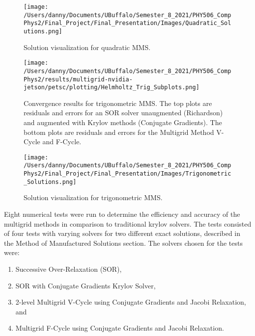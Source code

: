\documentclass[]{article}
\theoremstyle{definition}
\begin{document}
\begin{figure}[H]
\begin{center}
\texttt{[image: /Users/danny/Documents/UBuffalo/Semester\_8\_2021/PHY506\_CompPhys2/Final\_Project/Final\_Presentation/Images/Quadratic\_Solutions.png]}
\end{center}
\caption{Solution visualization for quadratic MMS.}
\label{VisQuad}
\end{figure}

\begin{figure}[H]
\begin{center}
\texttt{[image: /Users/danny/Documents/UBuffalo/Semester\_8\_2021/PHY506\_CompPhys2/results/multigrid-nvidia-jetson/petsc/plotting/Helmholtz\_Trig\_Subplots.png]}
\end{center}
\caption{Convergence results for trigonometric MMS.  The top plots are residuals and errors for an SOR solver unaugmented (Richardson) and augmented with Krylov methods (Conjugate Gradients).  The bottom plots are residuals and errors for the Multigrid Method V-Cycle and F-Cycle.}
\label{ConvTrig}
\end{figure}

\begin{figure}[H]
\begin{center}
\texttt{[image: /Users/danny/Documents/UBuffalo/Semester\_8\_2021/PHY506\_CompPhys2/Final\_Project/Final\_Presentation/Images/Trigonometric\_Solutions.png]}
\end{center}
\caption{Solution visualization for trigonometric MMS.}
\label{VisTrig}
\end{figure}

Eight numerical tests were run to determine the efficiency and accuracy of the multigrid methods in comparison to traditional krylov solvers.  The tests consisted of four tests with varying solvers  for two different exact solutions, described in the Method of Manufactured Solutions section.  The solvers chosen for the tests were:
\begin{enumerate}
\item Successive Over-Relaxation (SOR),
\item SOR with Conjugate Gradients Krylov Solver,
\item 2-level Multigrid V-Cycle using Conjugate Gradients and Jacobi Relaxation, and
\item Multigrid F-Cycle using Conjugate Gradients and Jacobi Relaxation.
\end{enumerate}
\end{document}

